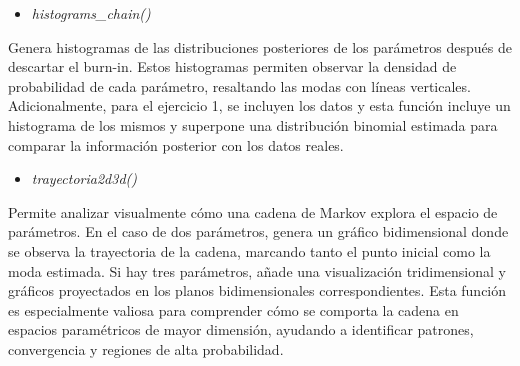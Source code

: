 \begin{itemize}
	\item \textit{histograms\_chain()}
\end{itemize}
Genera histogramas de las distribuciones posteriores de los parámetros después de descartar el burn-in. Estos histogramas permiten observar la densidad de probabilidad de cada parámetro, resaltando las modas con líneas verticales. Adicionalmente, para el ejercicio 1, se incluyen los datos y esta función incluye un histograma de los mismos y superpone una distribución binomial estimada para comparar la información posterior con los datos reales.

\begin{itemize}
	\item \textit{trayectoria2d3d()}
\end{itemize}
Permite analizar visualmente cómo una cadena de Markov explora el espacio de parámetros. En el caso de dos parámetros, genera un gráfico bidimensional donde se observa la trayectoria de la cadena, marcando tanto el punto inicial como la moda estimada. Si hay tres parámetros, añade una visualización tridimensional y gráficos proyectados en los planos bidimensionales correspondientes. Esta función es especialmente valiosa para comprender cómo se comporta la cadena en espacios paramétricos de mayor dimensión, ayudando a identificar patrones, convergencia y regiones de alta probabilidad.